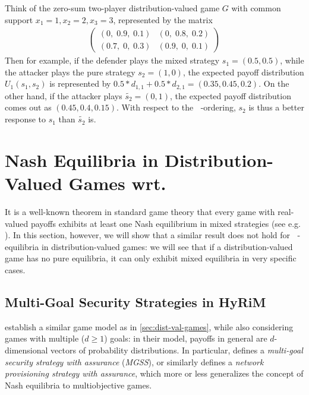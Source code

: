 \documentclass[a4paper]{scrreprt}
\DeclareMathOperator{\leqtail}{\leq_{\text{tail}}}
\begin{document}
    \begin{ex}
        Think of the zero-sum two-player distribution-valued game $G$ with common support $x_1=1, x_2=2, x_3=3$, represented by the matrix
        \begin{gather*}
            \begin{pmatrix}
                (0,\; 0.9,\; 0.1) & (0,\; 0.8,\; 0.2) \\
                (0.7,\; 0,\; 0.3) & (0.9,\; 0,\; 0.1)
            \end{pmatrix}
        \end{gather*}
        Then for example, if the defender plays the mixed strategy $s_1 = (0.5, 0.5)$, while the attacker plays the pure strategy $s_2 = (1, 0)$, the expected payoff distribution $U_1(s_1, s_2)$ is represented by $0.5 * d_{1,1} + 0.5 * d_{2,1} = (0.35, 0.45, 0.2)$. On the other hand, if the attacker plays $\tilde{s_2} = (0, 1)$, the expected payoff distribution comes out as $(0.45, 0.4, 0.15)$. With respect to the $\leqtail$-ordering, $s_2$ is thus a better response to $s_1$ than $\tilde{s_2}$ is.
    \end{ex}

    \section{Nash Equilibria in Distribution-Valued Games wrt. $\leqtail$}
    It is a well-known theorem in standard game theory that every game with real-valued payoffs exhibits at least one Nash equilibrium in mixed strategies (see e.g. \cite{bib:matsumotoGameTheory}).
    In this section, however, we will show that a similar result does not hold for $\leqtail$-equilibria in distribution-valued games: we will see that if a distribution-valued game has no pure equilibria, it can only exhibit mixed equilibria in very specific cases.
    
    \subsection{Multi-Goal Security Strategies in HyRiM}
    \cite{bib:rassGameRiskManagI,bib:rassGameRiskManagII} establish a similar game model as in \autoref{sec:dist-val-games}, while also considering games with multiple ($d \geq 1$) goals: in their model, payoffs in general are $d$-dimensional vectors of probability distributions.
    In particular, \cite{bib:rassGameRiskManagII} defines a \emph{multi-goal security strategy with assurance} (\emph{MGSS}), or similarly \cite{bib:rassGameTheoreticNWSecProv} defines a \emph{network provisioning strategy with assurance}, which more or less generalizes the concept of Nash equilibria to multiobjective games. 
    
\end{document}
